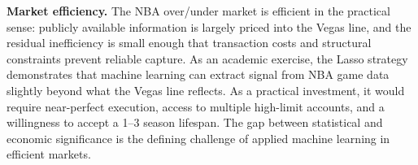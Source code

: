\documentclass[11pt]{extarticle}
\begin{document}
\textbf{Market efficiency.} The NBA over/under market is efficient in the practical sense: publicly available information is largely priced into the Vegas line, and the residual inefficiency is small enough that transaction costs and structural constraints prevent reliable capture. As an academic exercise, the Lasso strategy demonstrates that machine learning can extract signal from NBA game data slightly beyond what the Vegas line reflects. As a practical investment, it would require near-perfect execution, access to multiple high-limit accounts, and a willingness to accept a 1--3 season lifespan. The gap between statistical and economic significance is the defining challenge of applied machine learning in efficient markets.
\end{document}
